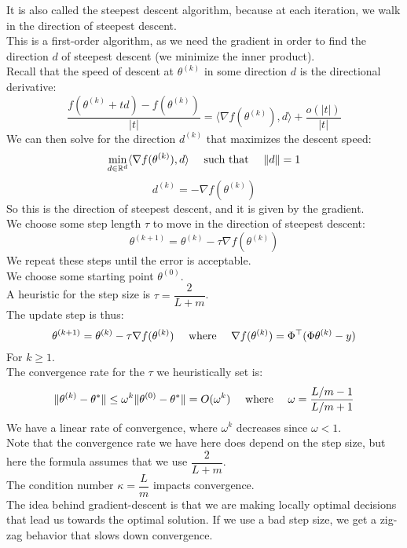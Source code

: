 \documentclass[12pt]{article}
\begin{document}
It is also called the steepest descent algorithm,
because at each iteration, we walk in the direction
of steepest descent. \\

This is a first-order algorithm, as we need the gradient
in order to find the direction $d$ of steepest descent
(we minimize the inner product). \\

Recall that the speed of descent at $\theta^{(k)}$
in some direction $d$ is the directional
derivative:
\[ \frac{f(\theta^{(k)} + t d) - 
f(\theta^{(k)})}{|t|} = 
\langle \nabla f(\theta^{(k)}), 
d \rangle + \frac{o(|t|)}{|t|} \]
We can then solve for the direction $d^{(k)}$
that maximizes the descent speed:
\[ \min_{d \in \mathbb{R}^d} 
\langle \nabla f(\theta^{(k)}), 
d \rangle \quad \text{ such that } \quad \|d\| = 1\]
\[ d^{(k)} = -\nabla f(\theta^{(k)}) \]
So this is the direction of steepest descent,
and it is given by the gradient. \\

We choose some step length $\tau$ to move in the direction
of steepest descent:
\[ \theta^{(k+1)} = \theta^{(k)} -\tau \nabla f(\theta^{(k)}) \]
We repeat these steps until the error is acceptable. \\

We choose some starting point $\theta^{(0)}$. \\

A heuristic for the step size is $\tau = \dfrac{2}{L + m}$. \\

The update step is thus:
\[ \theta^{(k+1)} = \theta^{(k)} - \tau 
\nabla f(\theta^{(k)})
\quad \text{ where } \quad \nabla 
f(\theta^{(k)}) = \Phi^\top 
(\Phi \theta^{(k)} - y)\]
For $k \geq 1$. \\

The convergence rate for the $\tau$
we heuristically set is:
\[ \|\theta^{(k)} - \theta^*\| 
\leq \omega^k \|\theta^{(0)} - \theta^*\| 
= O(\omega^k) \quad \text{ where }
\quad \omega = \frac{L/m - 1}{L/m + 1} \]
We have a linear rate of convergence, 
where $\omega^k$
decreases since $\omega < 1$. \\
Note that the convergence rate we have
here does depend on the step size, but here the formula
assumes that we use $\dfrac{2}{L + m}$. \\

The condition number $\kappa = \dfrac{L}{m}$
impacts convergence. \\

The idea behind gradient-descent is that we are making
locally optimal decisions that lead us towards the 
optimal solution. If we use a bad step size, we get a
zig-zag behavior that slows down convergence. \\
\end{document}
